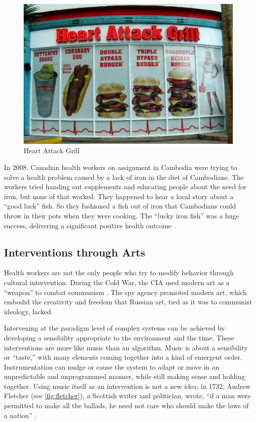 \begin{figure}[h]
 \centering
 \includegraphics[width=.5\textwidth]{pictures/heart-attack.eps}
 \caption{Heart Attack Grill}
 \label{fig:heart-attack}
\end{figure}


In 2008, Canadian health workers on assignment in Cambodia were trying to solve a health problem caused by a lack of iron in the diet of Cambodians. The workers tried handing out supplements and educating people about the need for iron, but none of that worked. They happened to hear a local story about a ``good luck'' fish. So they fashioned a fish out of iron that Cambodians could throw in their pots when they were cooking. The ``lucky iron fish'' was a huge success, delivering a significant positive health outcome \cite{charles2010iron}.

\subsection{Interventions through Arts}

Health workers are not the only people who try to modify behavior through cultural intervention. During the Cold War, the \ac{CIA} used modern art as a ``weapon'' to combat communism \cite{cia-communism}. The spy agency promoted modern art, which embodid the creativity and freedom that Russian art, tied as it was to communist ideology, lacked.

Intervening at the paradigm level of complex systems can be achieved by developing a sensibility appropriate to the environment and the time. These interventions are more like music than an algorithm. Music is about a sensibility or ``taste,'' with many elements coming together into a kind of emergent order. Instrumentation can nudge or cause the system to adapt or move in an unpredictable and unprogrammed manner, while still making sense and holding together. Using music itself as an intervention is not a new idea; in 1732, Andrew Fletcher (see \autoref{fig:fletcher}), a Scottish writer and politician, wrote, ``if a man were permitted to make all the ballads, he need not care who should make the laws of a nation'' \cite{brown2015eighteenth}.


